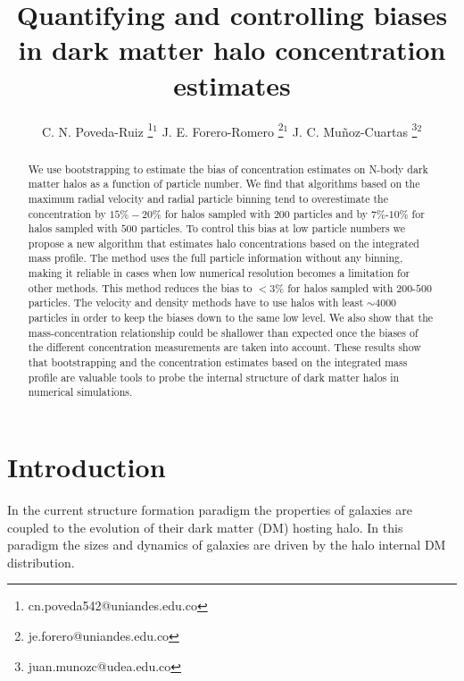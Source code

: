 \documentclass{emulateapj}
\begin{document}
\title{Quantifying and controlling biases in dark matter halo concentration estimates}
\author{
  C. N. Poveda-Ruiz \thanks{cn.poveda542@uniandes.edu.co}$^{1}$
  J. E. Forero-Romero \thanks{je.forero@uniandes.edu.co}$^{1}$
  J. C. Mu\~noz-Cuartas \thanks{juan.munozc@udea.edu.co}$^{2}$
}




\begin{abstract}
We use bootstrapping to estimate the bias of concentration
estimates on N-body dark matter halos as a function of particle
number. 
We find that algorithms based on the maximum radial velocity
and radial particle binning tend to overestimate the concentration by 
$15\%-20\%$ for halos sampled with $200$ particles and by $7\%$-$10\%$
for halos sampled with $500$ particles. 
To control this bias at low particle numbers we propose a new
algorithm that estimates halo concentrations based on the integrated
mass profile.
The method uses the full particle information without any binning,
making it reliable in cases when low numerical resolution becomes a
limitation for other methods.
This method reduces the bias to $< 3\%$ for halos sampled with
$200$-$500$ particles.
The velocity and density methods have to use halos with least $\sim
4000$ particles in order to keep the biases down to the same low
level. 
We also show that the mass-concentration relationship could be
shallower than expected once the biases  of the different
concentration measurements are taken into account. 
These results show that bootstrapping and the concentration estimates
based on the integrated mass profile are valuable tools to probe the
internal structure of dark matter halos in numerical simulations. 
\end{abstract}



\section{Introduction}
\label{sec:introduction}
In the current structure formation paradigm the properties of galaxies
are coupled to the evolution of their dark matter (DM) hosting halo.
In this paradigm the sizes and dynamics of galaxies are driven by
the halo internal DM distribution. 
\end{document}
